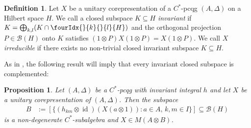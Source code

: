 \documentclass[11pt]{article}
\DeclareMathOperator{\id}{id}
\newcommand{\Gr}[5]{\fourIdx{#2}{#4}{#3}{#5}{#1}}%
\newcommand{\Grd}[3]{\Gr{#1}{}{}{#2}{#3}}
\newtheorem{Prop}[Theorem]{Proposition}
\theoremstyle{definition}
\newtheorem{Def}[Theorem]{Definition}
\numberwithin{equation}{section}
\begin{document}
\begin{Def}
Let $X$ be a unitary corepresentation of a $C^{*}$-pcqg $(A,\Delta)$ on a
  Hilbert space $H$. We call a closed subspace $K\subseteq H$
  \emph{invariant} if $K=\bigoplus_{k,l} (K \cap \Grd{H}{k}{l})$ and
  the orthogonal projection $P\in \mathcal{B}(H)$ onto $K$ satisfies
  $(1\otimes P)X(1\otimes P)=X(1\otimes P)$.  We call $X$
  \emph{irreducible} if there exists no non-trivial closed invariant
  subspace $K\subseteq H$.
\end{Def}
As in \cite{MVD1}, the  following result will imply that every invariant closed subspace is complemented:
 \begin{Prop}\label{prop:corep-complemented}
   Let $(A,\Delta)$ be a $C^{*}$-pcqg with invariant integral $h$ and
   let $X$ be a unitary corepresentation of $(A,\Delta)$. Then the
   subspace
   \begin{align*}
     B &:= [ \{(h_{km} \otimes
     \id)(X(a\otimes 1)) : a \in A,\, k,m\in I\}] \subseteq \mathcal{B}(H)
   \end{align*}
   is a non-degenerate $C^{*}$-subalgebra and $X\in M(A\otimes B)$.
 \end{Prop}
\end{document}
